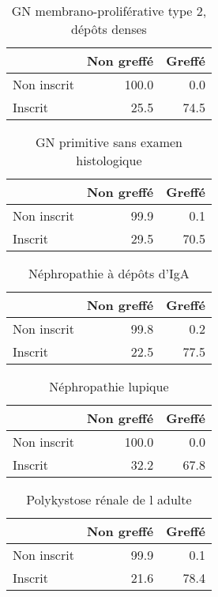 \documentclass[11pt,a4paper]{article}\usepackage[]{graphicx}\usepackage[]{color}
\begin{document}
\begin{table}[H]
\centering
\begin{tabular}{lrr}
  \hline
 & Non greffé & Greffé \\ 
  \hline
Non inscrit & 100.0 & 0.0 \\ 
  Inscrit & 25.5 & 74.5 \\ 
   \hline
\end{tabular}
\caption{GN membrano-proliférative type 2, dépôts denses} 
\end{table}
\begin{table}[H]
\centering
\begin{tabular}{lrr}
  \hline
 & Non greffé & Greffé \\ 
  \hline
Non inscrit & 99.9 & 0.1 \\ 
  Inscrit & 29.5 & 70.5 \\ 
   \hline
\end{tabular}
\caption{GN primitive sans examen histologique} 
\end{table}
\begin{table}[H]
\centering
\begin{tabular}{lrr}
  \hline
 & Non greffé & Greffé \\ 
  \hline
Non inscrit & 99.8 & 0.2 \\ 
  Inscrit & 22.5 & 77.5 \\ 
   \hline
\end{tabular}
\caption{Néphropathie à dépôts d'IgA} 
\end{table}
\begin{table}[H]
\centering
\begin{tabular}{lrr}
  \hline
 & Non greffé & Greffé \\ 
  \hline
Non inscrit & 100.0 & 0.0 \\ 
  Inscrit & 32.2 & 67.8 \\ 
   \hline
\end{tabular}
\caption{Néphropathie lupique} 
\end{table}
\begin{table}[H]
\centering
\begin{tabular}{lrr}
  \hline
 & Non greffé & Greffé \\ 
  \hline
Non inscrit & 99.9 & 0.1 \\ 
  Inscrit & 21.6 & 78.4 \\ 
   \hline
\end{tabular}
\caption{Polykystose rénale de l adulte} 
\end{table}
\end{document}
